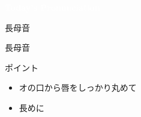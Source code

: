 \documentclass[aspectratio=169,xcolor={dvipsnames,table}]{beamer}
\begin{document}
\begin{frame}

\centering
  \textcolor{white}{\Huge\bfseries Today's Pronunciation}

 \vspace{30pt}

  \textcolor{white}{\Huge\bfseries {}}
\end{frame}
\begin{frame}[plain]{長母音 }

{\Large 長母音} {\Huge{}}

\vspace*{20pt}

\normalsize
ポイント

\begin{itemize}[circle]
 \item オの口から唇をしっかり丸めて
 \item 長めに
\end{itemize}


\end{frame}
\end{document}
